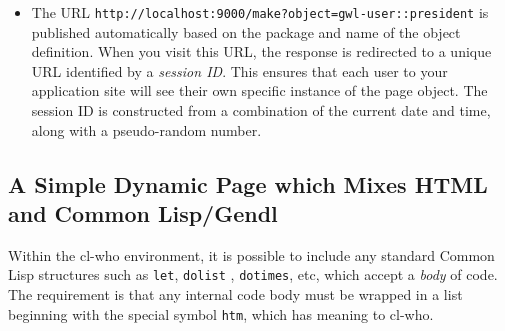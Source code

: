 \documentclass [11pt]{book}
\begin{document}
\begin{itemize}
\item The URL \texttt{http://localhost:9000/make?object=gwl-user::president} is published automatically based on the package and
      name of the object definition. When you visit this URL, the
      response is redirected to a unique URL identified by
      a \emph{session ID}. This ensures that each user to your
      application site will see their own specific instance of the
      page object. The session ID is constructed from a combination of
      the current date and time, along with a pseudo-random
      number.

\end{itemize}





\subsection{A Simple Dynamic Page which Mixes HTML and Common Lisp/Gendl}

\label{subsec:asimpledynamicpagewhichmixeshtmlandcommonlisp/gendl}



Within the cl-who environment, it is possible to include any standard
Common Lisp structures such as \texttt{let}, \texttt{dolist} , \texttt{dotimes}, etc, which accept a \emph{body} of code. The requirement is that any internal code body
	  must be wrapped in a list beginning with the special symbol \texttt{htm}, which has meaning to cl-who. 
\end{document}
